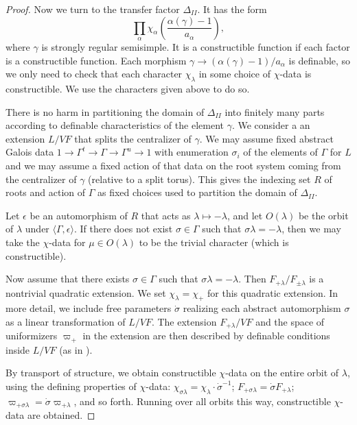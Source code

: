 \begin{proof}
Now we turn to the transfer factor $\Delta_{II}$.  It has the form
\[
\prod_\alpha \chi_\alpha
\left(\frac{\alpha(\gamma)-1}{a_\alpha}\right),
\]
where $\gamma$ is strongly regular semisimple.
It is a constructible function if each factor is a constructible
function. Each morphism $\gamma\to(\alpha(\gamma)-1)/a_\alpha$ is
definable, so we only need to check that each character $\chi_\lambda$
in some choice of $\chi$-data is constructible.  We use the characters
given above to do so.

There is no harm in partitioning the domain of $\Delta_{II}$ into
finitely
many parts according
to definable characteristics of the element $\gamma$.  We consider a
an extension $L/VF$ that splits the centralizer of $\gamma$.  We
may assume fixed abstract Galois data $1\to\Gamma^t\to\Gamma\to
\Gamma^u\to 1$ with enumeration $\sigma_i$ of the elements of $\Gamma$
for $L$ and we may assume a fixed action of that data on the root
system coming from the centralizer of $\gamma$ (relative to a split
torus).  This gives the indexing set $R$ of roots and action of
$\Gamma$ as fixed choices used to partition the domain of
$\Delta_{II}$.

Let $\epsilon$ be an automorphism of $R$ that acts as $\lambda\mapsto
-\lambda$, and let $O(\lambda)$ be the orbit of $\lambda$ under
$\langle\Gamma,\epsilon\rangle$.  If there does not exist
$\sigma\in\Gamma$ such that $\sigma\lambda=-\lambda$, then we may take
the $\chi$-data for $\mu\in O(\lambda)$ to be the trivial character
(which is constructible).

Now assume that there exists $\sigma\in\Gamma$ such that
$\sigma\lambda = -\lambda$.  Then $F_{+\lambda}/F_{\pm \lambda}$ is a
nontrivial quadratic extension.  We set $\chi_\lambda = \chi_+$ for
this quadratic extension.  In more detail, we include free parameters
$\dot\sigma$ realizing each abstract automorphism $\sigma$ as a
linear transformation of $L/VF$.  The extension $F_{+\lambda}/VF$ and
the space of uniformizers $\varpi_+$ in the extension are then
described by definable conditions inside $L/VF$ (as in
\cite{cluckers2011transfer}).

By transport of structure, we obtain constructible $\chi$-data on the
entire orbit of $\lambda$, using the defining properties of
$\chi$-data: $\chi_{\sigma\lambda} = \chi_{\lambda}\cdot
\dot\sigma^{-1}$; $F_{+\sigma\lambda}=\dot\sigma F_{+\lambda}$;
$\varpi_{+\sigma\lambda}=\dot\sigma\varpi_{+\lambda}$, and so forth.
Running over all orbits this way, constructible $\chi$-data are
obtained.
\end{proof}


